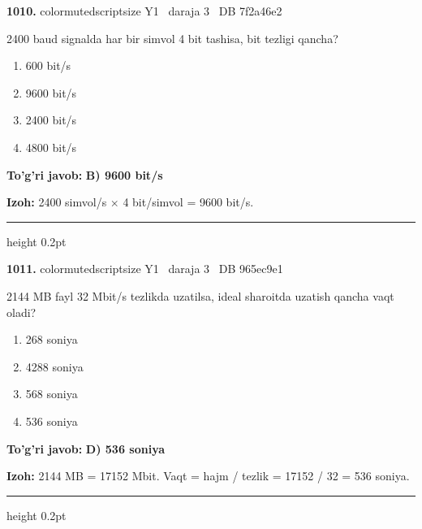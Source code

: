 \documentclass[10pt,a4paper,oneside]{article}
\begin{document}
\noindent\textbf{\color{ink}1010.}  {color{muted}scriptsize Y1 \textbullet\ daraja 3 \textbullet\ DB 7f2a46e2}
\par
2400 baud signalda har bir simvol 4 bit tashisa, bit tezligi qancha?
\begin{enumerate}[label=\Alph*),leftmargin=9mm]
\item 600 bit/s
\item 9600 bit/s
\item 2400 bit/s
\item 4800 bit/s
\end{enumerate}
\begin{tcolorbox}[enhanced,breakable,colback=teal!4,colframe=teal!50!black,boxrule=0.5pt,arc=1.1mm,left=3mm,right=3mm,top=1.7mm,bottom=1.7mm,before skip=2mm,after skip=2mm]
\textbf{\color{teal}To'g'ri javob:} \textbf{B) 9600 bit/s}
\par\smallskip
\textbf{Izoh:} 2400 simvol/s \ensuremath{\times} 4 bit/simvol = 9600 bit/s.
\end{tcolorbox}
\vspace{2mm}\hrule height 0.2pt \vspace{3mm}

\noindent\textbf{\color{ink}1011.}  {color{muted}scriptsize Y1 \textbullet\ daraja 3 \textbullet\ DB 965ec9e1}
\par
2144 MB fayl 32 Mbit/s tezlikda uzatilsa, ideal sharoitda uzatish qancha vaqt oladi?
\begin{enumerate}[label=\Alph*),leftmargin=9mm]
\item 268 soniya
\item 4288 soniya
\item 568 soniya
\item 536 soniya
\end{enumerate}
\begin{tcolorbox}[enhanced,breakable,colback=teal!4,colframe=teal!50!black,boxrule=0.5pt,arc=1.1mm,left=3mm,right=3mm,top=1.7mm,bottom=1.7mm,before skip=2mm,after skip=2mm]
\textbf{\color{teal}To'g'ri javob:} \textbf{D) 536 soniya}
\par\smallskip
\textbf{Izoh:} 2144 MB = 17152 Mbit. Vaqt = hajm / tezlik = 17152 / 32 = 536 soniya.
\end{tcolorbox}
\vspace{2mm}\hrule height 0.2pt \vspace{3mm}
\end{document}
